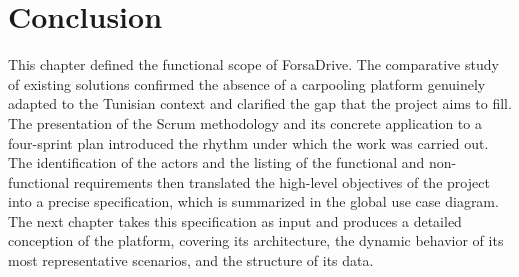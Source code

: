 \section*{Conclusion}

This chapter defined the functional scope of ForsaDrive. The comparative study of existing solutions confirmed the absence of a carpooling platform genuinely adapted to the Tunisian context and clarified the gap that the project aims to fill. The presentation of the Scrum methodology and its concrete application to a four-sprint plan introduced the rhythm under which the work was carried out. The identification of the actors and the listing of the functional and non-functional requirements then translated the high-level objectives of the project into a precise specification, which is summarized in the global use case diagram. The next chapter takes this specification as input and produces a detailed conception of the platform, covering its architecture, the dynamic behavior of its most representative scenarios, and the structure of its data.
